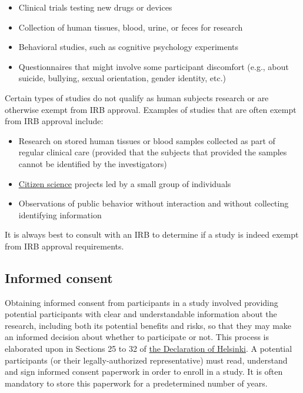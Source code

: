 \documentclass[letterpaper, 12pt]{article}
\begin{document}
\begin{itemize}
    \setlength\itemsep{-0.5em}
    \item Clinical trials testing new drugs or devices
    \item Collection of human tissues, blood, urine, or feces for research
    \item Behavioral studies, such as cognitive psychology experiments
    \item Questionnaires that might involve some participant discomfort (e.g., about suicide, bullying, sexual orientation, gender identity, etc.)
\end{itemize}

Certain types of studies do not qualify as human subjects research or are otherwise exempt from IRB approval. Examples of studies that are often exempt from IRB approval include:

\begin{itemize}
    \setlength\itemsep{-0.5em}
    \item Research on stored human tissues or blood samples collected as part of regular clinical care (provided that the subjects that provided the samples cannot be identified by the investigators)
    \item \href{https://en.wikipedia.org/wiki/Citizen_science}{Citizen science} projects led by a small group of individuals
    \item Observations of public behavior without interaction and without collecting identifying information
\end{itemize}

It is always best to consult with an IRB to determine if a study is indeed exempt from IRB approval requirements.

\subsection*{Informed consent}

Obtaining informed consent from participants in a study involved providing potential participants with clear and understandable information about the research, including both its potential benefits and risks, so that they may make an informed decision about whether to participate or not. This process is elaborated upon in Sections 25 to 32 of \href{https://www.wma.net/policies-post/wma-declaration-of-helsinki/}{the Declaration of Helsinki}. A potential participants (or their legally-authorized representative) must read, understand and sign informed consent paperwork in order to enroll in a study. It is often mandatory to store this paperwork for a predetermined number of years.
\end{document}
